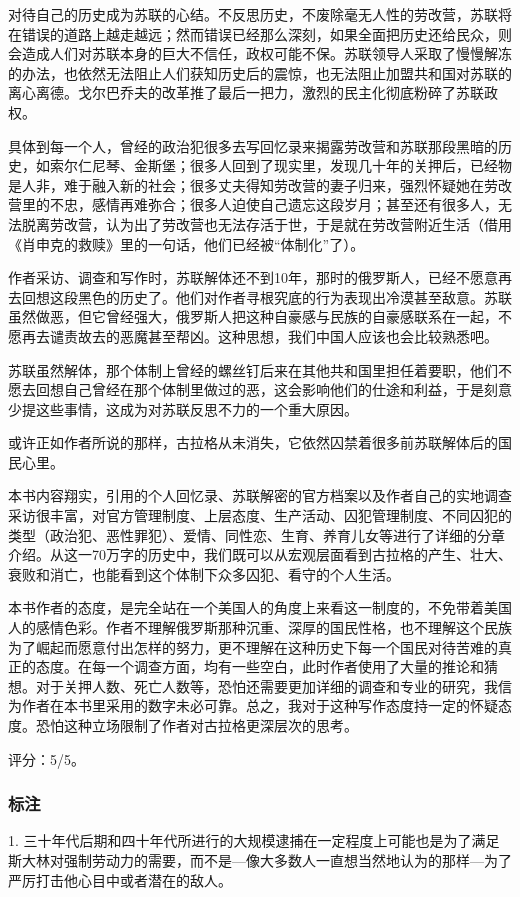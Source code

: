 对待自己的历史成为苏联的心结。不反思历史，不废除毫无人性的劳改营，苏联将在错误的道路上越走越远；然而错误已经那么深刻，如果全面把历史还给民众，则会造成人们对苏联本身的巨大不信任，政权可能不保。苏联领导人采取了慢慢解冻的办法，也依然无法阻止人们获知历史后的震惊，也无法阻止加盟共和国对苏联的离心离德。戈尔巴乔夫的改革推了最后一把力，激烈的民主化彻底粉碎了苏联政权。

具体到每一个人，曾经的政治犯很多去写回忆录来揭露劳改营和苏联那段黑暗的历史，如索尔仁尼琴、金斯堡；很多人回到了现实里，发现几十年的关押后，已经物是人非，难于融入新的社会；很多丈夫得知劳改营的妻子归来，强烈怀疑她在劳改营里的不忠，感情再难弥合；很多人迫使自己遗忘这段岁月；甚至还有很多人，无法脱离劳改营，认为出了劳改营也无法存活于世，于是就在劳改营附近生活（借用《肖申克的救赎》里的一句话，他们已经被“体制化”了）。

作者采访、调查和写作时，苏联解体还不到10年，那时的俄罗斯人，已经不愿意再去回想这段黑色的历史了。他们对作者寻根究底的行为表现出冷漠甚至敌意。苏联虽然做恶，但它曾经强大，俄罗斯人把这种自豪感与民族的自豪感联系在一起，不愿再去谴责故去的恶魔甚至帮凶。这种思想，我们中国人应该也会比较熟悉吧。

苏联虽然解体，那个体制上曾经的螺丝钉后来在其他共和国里担任着要职，他们不愿去回想自己曾经在那个体制里做过的恶，这会影响他们的仕途和利益，于是刻意少提这些事情，这成为对苏联反思不力的一个重大原因。

或许正如作者所说的那样，古拉格从未消失，它依然囚禁着很多前苏联解体后的国民心里。

本书内容翔实，引用的个人回忆录、苏联解密的官方档案以及作者自己的实地调查采访很丰富，对官方管理制度、上层态度、生产活动、囚犯管理制度、不同囚犯的类型（政治犯、恶性罪犯）、爱情、同性恋、生育、养育儿女等进行了详细的分章介绍。从这一70万字的历史中，我们既可以从宏观层面看到古拉格的产生、壮大、衰败和消亡，也能看到这个体制下众多囚犯、看守的个人生活。

本书作者的态度，是完全站在一个美国人的角度上来看这一制度的，不免带着美国人的感情色彩。作者不理解俄罗斯那种沉重、深厚的国民性格，也不理解这个民族为了崛起而愿意付出怎样的努力，更不理解在这种历史下每一个国民对待苦难的真正的态度。在每一个调查方面，均有一些空白，此时作者使用了大量的推论和猜想。对于关押人数、死亡人数等，恐怕还需要更加详细的调查和专业的研究，我信为作者在本书里采用的数字未必可靠。总之，我对于这种写作态度持一定的怀疑态度。恐怕这种立场限制了作者对古拉格更深层次的思考。

评分：5/5。

\subsubsection{标注}
1. 三十年代后期和四十年代所进行的大规模逮捕在一定程度上可能也是为了满足斯大林对强制劳动力的需要，而不是—像大多数人一直想当然地认为的那样—为了严厉打击他心目中或者潜在的敌人。

